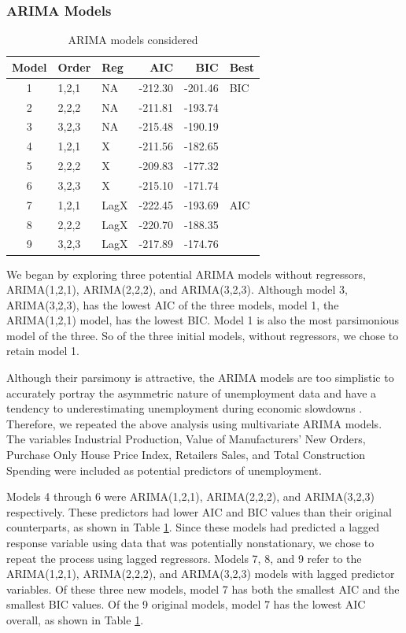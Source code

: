 \documentclass[twoside,twocolumn]{article}
\begin{document}
\subsubsection{ARIMA Models}
\begin{table}[htb]
\centering
\caption{ARIMA models considered}
\label{tab:arimachoices}
\begin{tabular}{cllrrl}
  \hline
 Model & Order & Reg  & AIC & BIC & Best \\
  \hline
1 & 1,2,1 &  NA &   -212.30 & -201.46 & BIC \\
  2  & 2,2,2 & NA   & -211.81 & -193.74 &  \\
  3  & 3,2,3 &  NA  & -215.48 & -190.19 &  \\
  4  & 1,2,1 & X  & -211.56 & -182.65 &  \\
  5  & 2,2,2 & X   & -209.83 & -177.32 &  \\
  6  & 3,2,3 & X   & -215.10 & -171.74 &  \\
  7  & 1,2,1 &  LagX & -222.45 & -193.69 & AIC \\
  8  & 2,2,2 &  LagX & -220.70 & -188.35 &  \\
  9  & 3,2,3 &  LagX & -217.89 & -174.76 &  \\
   \hline
\end{tabular}
\end{table}

We began by exploring three potential ARIMA models without regressors, ARIMA(1,2,1), ARIMA(2,2,2), and ARIMA(3,2,3). Although model 3, ARIMA(3,2,3), has the lowest AIC of the three models, model 1, the ARIMA(1,2,1) model, has the lowest BIC. Model 1 is also the most parsimonious model of the three. So of the three initial models, without regressors, we chose to retain model 1.

Although their parsimony is attractive, the ARIMA models are too simplistic to accurately portray the asymmetric nature of unemployment data and have a tendency to underestimating unemployment during economic slowdowns \citep{Montgomery1998}. Therefore, we repeated the above analysis using multivariate ARIMA models.  The variables Industrial Production, Value of Manufacturers' New Orders, Purchase Only House Price Index,  Retailers Sales, and Total Construction Spending were included as potential predictors of unemployment.

Models 4 through 6 were ARIMA(1,2,1), ARIMA(2,2,2), and ARIMA(3,2,3) respectively.  These predictors had lower AIC and BIC values than their original counterparts, as shown in Table \ref{tab:arimachoices}. Since these models had predicted a lagged response variable using data that was potentially nonstationary, we chose to repeat the process using lagged regressors.  Models 7, 8, and 9 refer to the ARIMA(1,2,1), ARIMA(2,2,2), and ARIMA(3,2,3) models with lagged predictor variables.  Of these three new models, model 7 has both the smallest AIC and the smallest BIC values. Of the 9 original models, model 7 has the lowest AIC overall, as shown in Table \ref{tab:arimachoices}.
\end{document}
